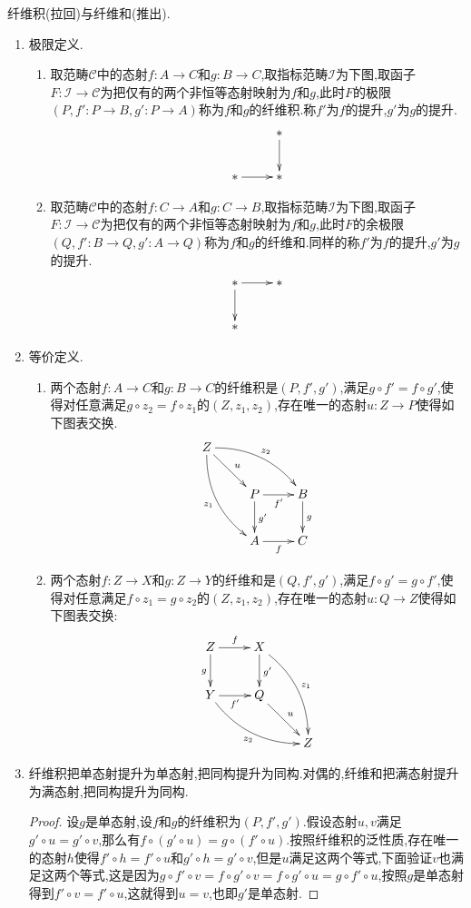 纤维积(拉回)与纤维和(推出).
\begin{enumerate}
	\item 极限定义.
	\begin{enumerate}
		\item 取范畴$\mathscr{C}$中的态射$f:A\to C$和$g:B\to C$,取指标范畴$\mathscr{I}$为下图,取函子$F:\mathscr{I}\to\mathscr{C}$为把仅有的两个非恒等态射映射为$f$和$g$,此时$F$的极限$(P,f':P\to B,g':P\to A)$称为$f$和$g$的纤维积.称$f'$为$f$的提升,$g'$为$g$的提升.
		$$\xymatrix{&\ast\ar[d]\\ \ast\ar[r]&\ast}$$
		\item 取范畴$\mathscr{C}$中的态射$f:C\to A$和$g:C\to B$,取指标范畴$\mathscr{I}$为下图,取函子$F:\mathscr{I}\to\mathscr{C}$为把仅有的两个非恒等态射映射为$f$和$g$,此时$F$的余极限$(Q,f':B\to Q,g':A\to Q)$称为$f$和$g$的纤维和.同样的称$f'$为$f$的提升,$g'$为$g$的提升.
		$$\xymatrix{\ast\ar[d]\ar[r]&\ast\\\ast&}$$
	\end{enumerate}
	\item 等价定义.
	\begin{enumerate}
		\item 两个态射$f:A\to C$和$g:B\to C$的纤维积是$(P,f',g')$,满足$g\circ f'=f\circ g'$,使得对任意满足$g\circ z_2=f\circ z_1$的$(Z,z_1,z_2)$,存在唯一的态射$u:Z\to P$使得如下图表交换.
		$$\xymatrix{Z\ar@/^1pc/[drr]^{z_2}\ar[dr]^u\ar@/_1pc/[ddr]_{z_1}&&\\&P\ar[r]_{f'}\ar[d]^{g'}&B\ar[d]^g\\&A\ar[r]_f&C}$$
		\item 两个态射$f:Z\to X$和$g:Z\to Y$的纤维和是$(Q,f',g')$,满足$f\circ g'=g\circ f'$,使得对任意满足$f\circ z_1=g\circ z_2$的$(Z,z_1,z_2)$,存在唯一的态射$u:Q\to Z$使得如下图表交换:
		$$\xymatrix{Z\ar[r]^f\ar[d]_g&X\ar[d]^{g'}\ar@/^1pc/[ddr]^{z_1}&\\Y\ar@/_1pc/[drr]_{z_2}\ar[r]_{f'}&Q\ar[dr]^u&\\&&Z}$$
	\end{enumerate}
	\item 纤维积把单态射提升为单态射,把同构提升为同构.对偶的,纤维和把满态射提升为满态射,把同构提升为同构.
	\begin{proof}
		
		设$g$是单态射,设$f$和$g$的纤维积为$(P,f',g')$.假设态射$u,v$满足$g'\circ u=g'\circ v$,那么有$f\circ(g'\circ u)=g\circ(f'\circ u)$.按照纤维积的泛性质,存在唯一的态射$h$使得$f'\circ h=f'\circ u$和$g'\circ h=g'\circ v$,但是$u$满足这两个等式,下面验证$v$也满足这两个等式,这是因为$g\circ f'\circ v=f\circ g'\circ v=f\circ g'\circ u=g\circ f'\circ u$,按照$g$是单态射得到$f'\circ v=f'\circ u$,这就得到$u=v$,也即$g'$是单态射.
		

\end{proof}
\end{enumerate}
